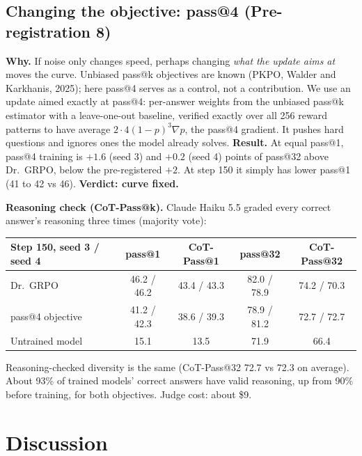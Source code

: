 \documentclass[11pt]{article}
\newcommand{\verdict}[1]{\textcolor{blue!50!black}{\textbf{Verdict: #1}}}
\begin{document}
\subsection{Changing the objective: pass@4 (Pre-registration 8)}
\textbf{Why.} If noise only changes speed, perhaps changing \emph{what the update aims at} moves the curve. Unbiased pass@k objectives are known (PKPO, Walder and Karkhanis, 2025); here pass@4 serves as a control, not a contribution. We use an update aimed exactly at pass@4: per-answer weights from the unbiased pass@k estimator with a leave-one-out baseline, verified exactly over all 256 reward patterns to have average $2\cdot4(1-p)^3\nabla p$, the pass@4 gradient. It pushes hard questions and ignores ones the model already solves.
\textbf{Result.} At equal pass@1, pass@4 training is $+1.6$ (seed 3) and $+0.2$ (seed 4) points of pass@32 above Dr.\ GRPO, below the pre-registered $+2$. At step 150 it simply has lower pass@1 (41 to 42 vs 46). \verdict{curve fixed.}

\textbf{Reasoning check (CoT-Pass@k).} Claude Haiku 5.5 graded every correct answer's reasoning three times (majority vote):
\begin{table}[H]
\centering\small
\begin{tabular}{@{}lcccc@{}}
\toprule
Step 150, seed 3 / seed 4 & pass@1 & CoT-Pass@1 & pass@32 & CoT-Pass@32\\
\midrule
Dr.\ GRPO & 46.2 / 46.2 & 43.4 / 43.3 & 82.0 / 78.9 & 74.2 / 70.3\\
pass@4 objective & 41.2 / 42.3 & 38.6 / 39.3 & 78.9 / 81.2 & 72.7 / 72.7\\
Untrained model & 15.1 & 13.5 & 71.9 & 66.4\\
\bottomrule
\end{tabular}
\end{table}
Reasoning-checked diversity is the same (CoT-Pass@32 72.7 vs 72.3 on average). About 93\% of trained models' correct answers have valid reasoning, up from 90\% before training, for both objectives. Judge cost: about \$9.

\section{Discussion}
\end{document}

